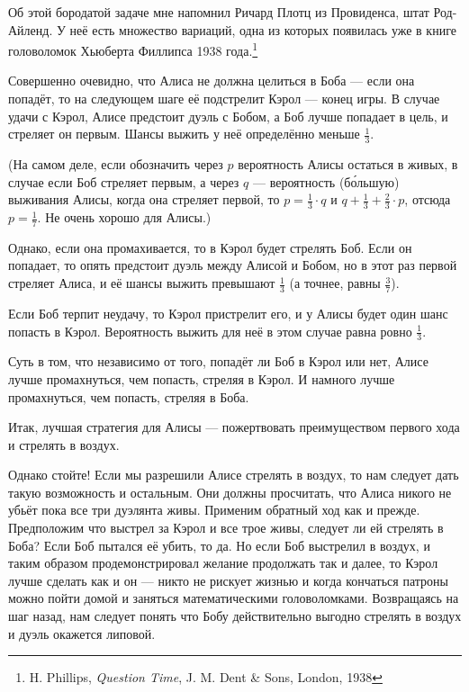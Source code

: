 Об этой бородатой задаче мне напомнил Ричард Плотц из Провиденса, штат Род-Айленд.
У неё есть множество вариаций, одна из которых появилась уже в книге головоломок Хьюберта Филлипса 1938 года.\footnote{H. Phillips, \emph{Question Time},  J. M. Dent \& Sons, London, 1938}

\medskip

Совершенно очевидно, что Алиса не должна целиться в Боба --- если она попадёт, то на следующем шаге её подстрелит Кэрол --- конец игры.
В случае удачи с Кэрол, Алисе предстоит дуэль с Бобом, а Боб лучше попадает в цель, и стреляет он первым.
Шансы выжить у неё определённо меньше $\tfrac13$.

(На самом деле, если обозначить через $p$ вероятность Алисы остаться в живых, в случае если Боб стреляет первым, а через $q$ --- вероятность (б\'{о}льшую) выживания Алисы, когда она стреляет первой, то $p=\tfrac13\cdot q$ и $q+\tfrac13+\tfrac23\cdot p$, отсюда $p=\tfrac17$.
Не очень хорошо для Алисы.)

Однако, если она промахивается, то в Кэрол будет стрелять Боб.
Если он попадает, то опять предстоит дуэль между Алисой и Бобом, но в этот раз первой стреляет Алиса, и её шансы выжить превышают $\tfrac13$ (а точнее, равны $\tfrac37$).

Если Боб терпит неудачу, то Кэрол пристрелит его, и у Алисы будет один шанс попасть в Кэрол.
Вероятность выжить для неё в этом случае равна ровно $\tfrac13$.

Суть в том, что независимо от того, попадёт ли Боб в Кэрол или нет, Алисе лучше промахнуться, чем попасть, стреляя в Кэрол.
И намного лучше промахнуться, чем попасть, стреляя в Боба.

Итак, лучшая стратегия для Алисы --- пожертвовать преимуществом первого хода и стрелять в воздух.

Однако стойте!
Если мы разрешили Алисе стрелять в воздух, то нам следует дать такую возможность и остальным. 
Они должны просчитать, что Алиса никого не убьёт пока все три дуэлянта живы. 
Применим обратный ход как и прежде.
Предположим что выстрел за Кэрол и все трое живы,
следует ли ей стрелять в Боба? 
Если Боб пытался её убить, то да.
Но если Боб выстрелил в воздух, и таким образом продемонстрировал желание продолжать так и далее,
то Кэрол лучше сделать как и он ---
никто не рискует жизнью и когда кончаться патроны можно пойти домой и заняться математическими головоломками.
Возвращаясь на шаг назад, нам следует понять что Бобу действительно выгодно стрелять в воздух и дуэль окажется липовой.

